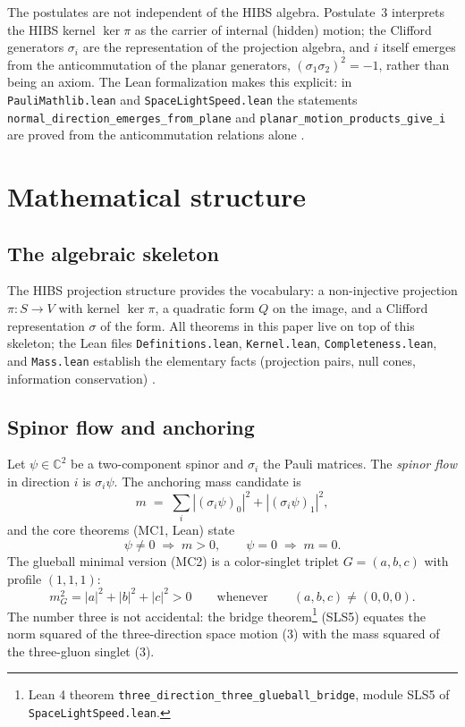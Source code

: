 \documentclass[aps,prd,preprint,superscriptaddress,amsmath,amssymb]{revtex4-2}
\begin{document}
The postulates are not independent of the HIBS algebra.  Postulate~3
interprets the HIBS kernel $\ker\pi$ as the carrier of internal (hidden)
motion; the Clifford generators $\sigma_i$ are the representation of the
projection algebra, and $i$ itself emerges from the anticommutation of the
planar generators, $(\sigma_1\sigma_2)^2=-1$, rather than being an axiom.
The Lean formalization makes this explicit: in \texttt{PauliMathlib.lean}
and \texttt{SpaceLightSpeed.lean} the statements
\texttt{normal\_direction\_emerges\_from\_plane} and
\texttt{planar\_motion\_products\_give\_i} are proved from the
anticommutation relations alone \cite{ProjectionPhysics-SLS}.

\section{Mathematical structure}\label{sec:math}

\subsection{The algebraic skeleton}

The HIBS projection structure provides the vocabulary: a non-injective
projection $\pi:S\to V$ with kernel $\ker\pi$, a quadratic form $Q$ on the
image, and a Clifford representation $\sigma$ of the form.  All theorems in
this paper live on top of this skeleton; the Lean files
\texttt{Definitions.lean}, \texttt{Kernel.lean}, \texttt{Completeness.lean},
and \texttt{Mass.lean} establish the elementary facts (projection pairs,
null cones, information conservation) \cite{ProjectionPhysics}.

\subsection{Spinor flow and anchoring}

Let $\psi\in\mathbb{C}^2$ be a two-component spinor and $\sigma_i$ the Pauli
matrices.  The \emph{spinor flow} in direction $i$ is $\sigma_i\psi$.  The
anchoring mass candidate is
\begin{equation}
m \;=\; \sum_i |(\sigma_i\psi)_0|^2 + |(\sigma_i\psi)_1|^2 ,
\end{equation}
and the core theorems (MC1, Lean) state
\begin{equation}
\psi \neq 0 \;\Longrightarrow\; m > 0 ,
\qquad
\psi = 0 \;\Longrightarrow\; m = 0 .
\end{equation}
The glueball minimal version (MC2) is a color-singlet triplet
$G=(a,b,c)$ with profile $(1,1,1)$:
\begin{equation}
m_G^2 = |a|^2 + |b|^2 + |c|^2 > 0
\qquad\text{whenever}\qquad (a,b,c)\neq(0,0,0).
\end{equation}
The number three is not accidental: the bridge theorem\footnote{Lean 4
theorem \texttt{three\_direction\_three\_glueball\_bridge}, module SLS5 of
\texttt{SpaceLightSpeed.lean}.} (SLS5) equates the norm squared of the
three-direction space motion (3) with the mass squared of the three-gluon
singlet (3).
\end{document}
